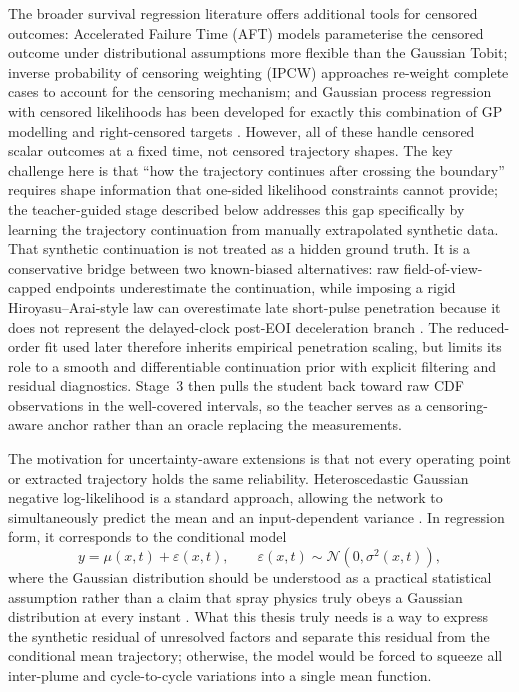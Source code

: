 The broader survival regression literature offers additional tools for censored outcomes: Accelerated Failure Time (AFT) models parameterise the censored outcome under distributional assumptions more flexible than the Gaussian Tobit; inverse probability of censoring weighting (IPCW) approaches re-weight complete cases to account for the censoring mechanism; and Gaussian process regression with censored likelihoods has been developed for exactly this combination of GP modelling and right-censored targets \cite{Groot2012CensoredGP}.
However, all of these handle censored scalar outcomes at a fixed time, not censored trajectory shapes.
The key challenge here is that ``how the trajectory continues after crossing the boundary'' requires shape information that one-sided likelihood constraints cannot provide; the teacher-guided stage described below addresses this gap specifically by learning the trajectory continuation from manually extrapolated synthetic data.
That synthetic continuation is not treated as a hidden ground truth.
It is a conservative bridge between two known-biased alternatives: raw field-of-view-capped endpoints underestimate the continuation, while imposing a rigid Hiroyasu--Arai-style law can overestimate late short-pulse penetration because it does not represent the delayed-clock post-EOI deceleration branch \cite{HiroyasuArai1990,ZhouLiLaiWei2019}.
The reduced-order fit used later therefore inherits empirical penetration scaling, but limits its role to a smooth and differentiable continuation prior with explicit filtering and residual diagnostics.
Stage~3 then pulls the student back toward raw CDF observations in the well-covered intervals, so the teacher serves as a censoring-aware anchor rather than an oracle replacing the measurements.

The motivation for uncertainty-aware extensions is that not every operating point or extracted trajectory holds the same reliability.
Heteroscedastic Gaussian negative log-likelihood is a standard approach, allowing the network to simultaneously predict the mean and an input-dependent variance \cite{KendallGal2017}.
In regression form, it corresponds to the conditional model
\[
y=\mu(x,t)+\varepsilon(x,t),\qquad \varepsilon(x,t)\sim \mathcal{N}(0,\sigma^2(x,t)),
\]
where the Gaussian distribution should be understood as a practical statistical assumption rather than a claim that spray physics truly obeys a Gaussian distribution at every instant \cite{BishopPRML2006,KendallGal2017}.
What this thesis truly needs is a way to express the synthetic residual of unresolved factors and separate this residual from the conditional mean trajectory;
otherwise, the model would be forced to squeeze all inter-plume and cycle-to-cycle variations into a single mean function.

